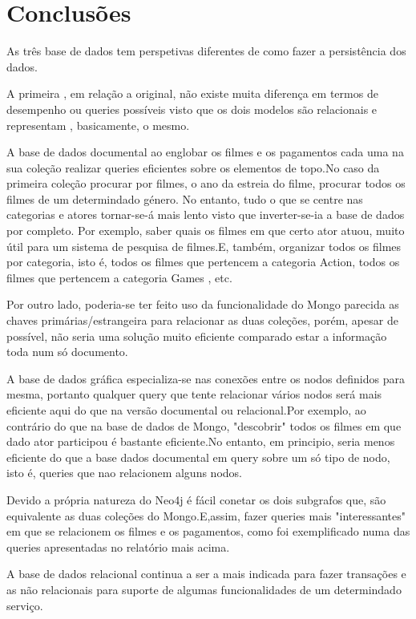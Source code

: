 \section{Conclusões}

As três base de dados tem perspetivas diferentes de como fazer a persistência dos dados. 

A primeira , em relação a original, não existe muita diferença em termos de desempenho ou queries possíveis visto que os dois modelos são relacionais e representam , basicamente, o mesmo.

A base de dados documental ao englobar os filmes e os pagamentos cada uma na sua coleção realizar queries eficientes sobre os elementos de topo.No caso da primeira coleção procurar por filmes, o ano da estreia do filme, procurar todos os filmes de um determindado género. No entanto, tudo o que se centre nas categorias e atores tornar-se-á mais lento visto que inverter-se-ia a base de dados por completo. Por exemplo, saber quais os filmes em que certo ator atuou, muito útil para um sistema de pesquisa de filmes.E, também, organizar todos os filmes por categoria, isto é, todos os filmes que pertencem a categoria Action, todos os filmes que pertencem a categoria Games , etc.

Por outro lado, poderia-se ter feito uso da funcionalidade do Mongo parecida as chaves primárias/estrangeira para relacionar as duas coleções, porém, apesar de possível, não seria uma solução muito eficiente comparado estar a informação toda num só documento.

A base de dados gráfica especializa-se nas conexões entre os nodos definidos para mesma, portanto qualquer query que tente relacionar vários nodos será mais eficiente aqui do que na versão documental ou relacional.Por exemplo, ao contrário do que na base de dados de Mongo, "descobrir" todos os filmes em que dado ator participou é bastante eficiente.No entanto, em principio, seria menos eficiente do que a base dados documental em query sobre um só tipo de nodo, isto é, queries que nao relacionem alguns nodos.

Devido a própria natureza do Neo4j é fácil conetar os dois subgrafos que, são equivalente as duas coleções do Mongo.E,assim, fazer queries mais "interessantes" em que se relacionem os filmes e os pagamentos, como foi exemplificado numa das queries apresentadas no relatório mais acima.

A base de dados relacional continua a ser a mais indicada para fazer transações e as não relacionais para suporte de algumas funcionalidades de um determindado serviço.
